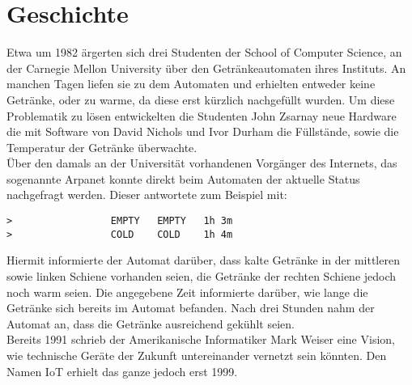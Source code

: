 \section{Geschichte}\label{s:gechichte}

Etwa um 1982 ärgerten sich drei Studenten der School of Computer Science, an der Carnegie Mellon University über den Getränkeautomaten ihres Instituts. An manchen Tagen liefen sie zu dem Automaten und erhielten entweder keine Getränke, oder zu warme, da diese erst kürzlich nachgefüllt wurden. Um diese Problematik zu lösen entwickelten die Studenten John Zsarnay neue Hardware die mit Software von David Nichols und Ivor Durham die Füllstände, sowie die Temperatur der Getränke überwachte\cite{ws:cmu}.\\
Über den damals an der Universität vorhandenen Vorgänger des Internets, das sogenannte Arpanet konnte direkt beim Automaten der aktuelle Status nachgefragt werden. Dieser antwortete zum Beispiel mit:\\

\begin{lstlisting}[frame=single] 
>                 EMPTY   EMPTY   1h 3m
>                 COLD    COLD    1h 4m
\end{lstlisting}

Hiermit informierte der Automat darüber, dass kalte Getränke in der mittleren sowie linken Schiene vorhanden seien, die Getränke der rechten Schiene jedoch noch warm seien. Die angegebene Zeit informierte darüber, wie lange die Getränke sich bereits im Automat befanden. Nach drei Stunden nahm der Automat an, dass die Getränke ausreichend gekühlt seien.\\

Bereits 1991 schrieb der Amerikanische Informatiker Mark Weiser eine Vision, wie technische Geräte der Zukunft untereinander vernetzt sein könnten\cite{ws:weiser}. 
Den Namen \ac{IoT} erhielt das ganze jedoch erst 1999.
